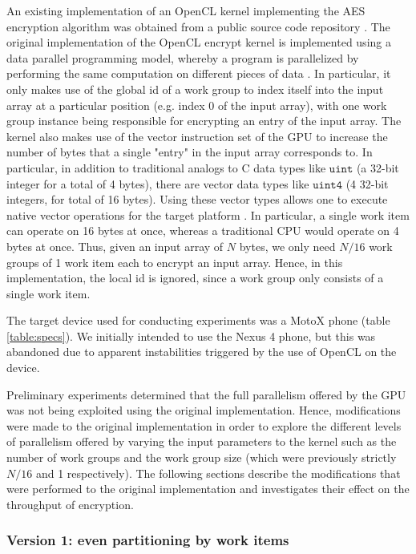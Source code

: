 \documentclass[conference,10pt]{IEEEtran}
\begin{document}
An existing implementation of an OpenCL kernel implementing the AES encryption algorithm was 
obtained from a public source code repository \cite{opencl_impl}.  The original implementation of 
the OpenCL encrypt kernel is implemented using a data parallel programming model, whereby a program 
is parallelized by performing the same computation on different pieces of data \cite{opencl_guide}.  
In particular, it only makes use of the global id of a work group to index itself into the input 
array at a particular position (e.g. index 0 of the input array), with one work group instance being 
responsible for encrypting an entry of the input array. The kernel also makes use of the vector 
instruction set of the GPU to increase the number of bytes that a single "entry" in the input array 
corresponds to. In particular, in addition to traditional analogs to C data types like 
$\mathtt{uint}$ (a 32-bit integer for a total of 4 bytes), there are vector data types like 
$\mathtt{uint4}$ (4 32-bit integers, for total of 16 bytes). Using these vector types allows one to 
execute native vector operations for the target platform \cite{opencl_guide}.  In particular, a 
single work item can operate on 16 bytes at once, whereas a traditional CPU would operate on 4 bytes 
at once. Thus, given an input array of $N$ bytes, we only need $N/16$ work groups of 1 work item 
each to encrypt an input array. Hence, in this implementation, the local id is ignored, since a work 
group only consists of a single work item.

The target device used for conducting experiments was a MotoX phone (table \ref{table:specs}).  We 
initially intended to use the Nexus 4 phone, but this was abandoned due to apparent instabilities 
triggered by the use of OpenCL on the device. 

Preliminary experiments determined that the full parallelism offered by the GPU was not being 
exploited using the original implementation.  Hence, modifications were made to the original 
implementation in order to explore the different levels of parallelism offered by varying the input 
parameters to the kernel such as the number of work groups and the work group size (which were 
previously strictly $N/16$ and 1 respectively).  The following sections describe the modifications 
that were performed to the original implementation and investigates their effect on the throughput 
of encryption.

\subsubsection{Version 1: even partitioning by work items}
\label{subsec:impl_partition}
\end{document}
